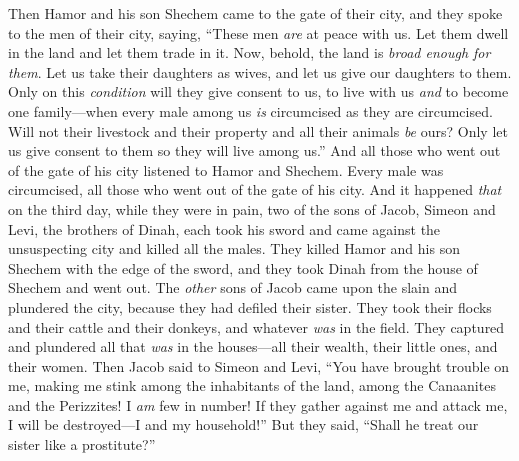\begin{biblechapter}
\verse Then Hamor and his son Shechem came to the gate of their city, and they spoke to the men of their city, saying,
\verse “These men \textit{are} at peace with us. Let them dwell in the land and let them trade in it. Now, behold, the land is \textit{broad enough for them}. Let us take their daughters as wives, and let us give our daughters to them.
\verse Only on this \textit{condition} will they give consent to us, to live with us \textit{and} to become one family—when every male among us \textit{is} circumcised as they are circumcised.
\verse Will not their livestock and their property and all their animals \textit{be} ours? Only let us give consent to them so they will live among us.”
\verse And all those who went out of the gate of his city listened to Hamor and Shechem. Every male was circumcised, all those who went out of the gate of his city.
\verse And it happened \textit{that} on the third day, while they were in pain, two of the sons of Jacob, Simeon and Levi, the brothers of Dinah, each took his sword and came against the unsuspecting city and killed all the males.
\verse They killed Hamor and his son Shechem with the edge of the sword, and they took Dinah from the house of Shechem and went out.
\verse The \textit{other} sons of Jacob came upon the slain and plundered the city, because they had defiled their sister.
\verse They took their flocks and their cattle and their donkeys, and whatever \textit{was} in the field.
\verse They captured and plundered all that \textit{was} in the houses—all their wealth, their little ones, and their women.
\verse Then Jacob said to Simeon and Levi, “You have brought trouble on me, making me stink among the inhabitants of the land, among the Canaanites and the Perizzites! I \textit{am} few in number! If they gather against me and attack me, I will be destroyed—I and my household!”
\verse But they said, “Shall he treat our sister like a prostitute?”
\end{biblechapter}

